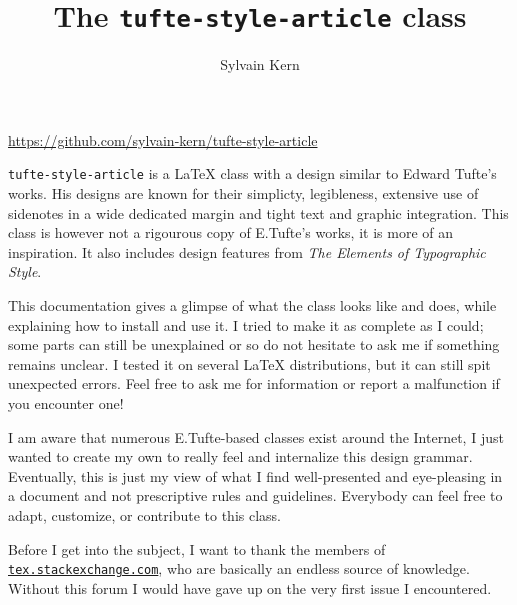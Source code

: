 \documentclass[raggedright, twoside, 11pt]{tufte-style-article}
\title{The \texttt{tufte-style-article} class}
\author{Sylvain Kern}
\begin{document}
\maketitle	

\vskip -25pt
\noindent\hspace{.1\textwidth}\url{https://github.com/sylvain-kern/tufte-style-article}
\vskip 25pt

\noindent
\texttt{tufte-style-article} is a \LaTeX{} class with a design similar to Edward Tufte's works. His designs are known for their simplicty, legibleness, extensive use of sidenotes in a wide dedicated margin and tight text and graphic integration. This class is however not a rigourous copy of E.Tufte's works, it is more of an inspiration. It also includes design features from \textit{The Elements of Typographic Style}.

This documentation gives a glimpse of what the class looks like and does, while explaining how to install and use it. I tried to make it as complete as I could; some parts can still be unexplained or so do not hesitate to ask me if something remains unclear. I tested it on several \LaTeX{} distributions, but it can still spit unexpected errors. Feel free to ask me for information or report a malfunction if you encounter one!

I am aware that numerous E.Tufte-based classes exist around the Internet, I just wanted to create my own to really feel and internalize this design grammar. Eventually, this is just my view of what I find well-presented and eye-pleasing in a document and not prescriptive rules and guidelines. Everybody can feel free to adapt, customize, or contribute to this class.

Before I get into the subject, I want to thank the members of\\\noindent \href{www.tex.stackexchange.com}{\texttt{tex.stackexchange.com}}, who are basically an endless source of knowledge. Without this forum I would have gave up on the very first issue I encountered. 

\newpage
\tableofcontents
\newpage
\end{document}
